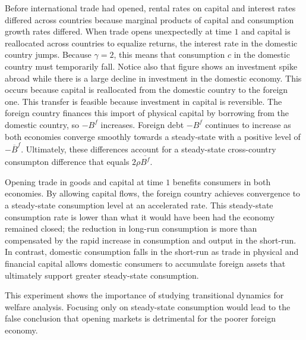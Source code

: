 Before international  trade had opened, rental rates on capital and interest rates differed across countries because
marginal products of capital and  consumption growth rates differed.  When trade opens unexpectedly  at
time $1$ and  capital is reallocated across countries to equalize returns,  the interest rate in the domestic country
jumps. Because $\gamma =2$, this means that consumption $c$ in the domestic country  must temporarily fall.
\newpage
\noindent Notice also that figure  shows an
investment spike abroad while  there is a large decline in investment in
the domestic economy. This occurs because capital is reallocated from the domestic country to the foreign one.
This transfer is feasible because investment in capital is
reversible. The foreign country finances this import of physical capital by borrowing from the domestic
country, so $- B^f$ increases. %
 Foreign debt $- B^f$  continues to increase as both economies converge smoothly towards a
steady-state with a positive level of $- \overline{B}^f$. Ultimately, these
differences account for a steady-state cross-country  consumpton difference that equals  $2 \rho
\overline{B^f}$.

Opening trade in goods and capital at time $1$ benefits consumers in both economies.
 By
 allowing capital flows, the foreign country achieves convergence to
a steady-state consumption level at an accelerated rate. This steady-state
consumption rate is lower than what it would have been  had the economy remained
closed;  the  reduction in long-run consumption is more than compensated
by the rapid increase in consumption and output in  the short-run. In contrast, domestic consumption
falls in the short-run as trade in physical and financial capital allows domestic consumers to accumulate
foreign assets that ultimately  support  greater steady-state consumption.

This experiment shows the importance of studying transitional dynamics for
welfare analysis. Focusing only on steady-state consumption
would lead to the false conclusion that opening markets is  detrimental for the 
poorer foreign  economy.


